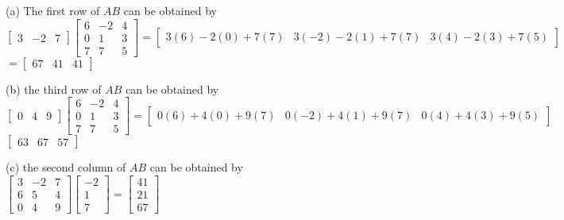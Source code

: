 \documentclass[addpoints]{exam}
\begin{document}
\begin{sloppypar}
\begin{questions}
\begin{solution}
        (a) The first row of $AB$ can be obtained by \\ 
        $ \begin{bmatrix}
            3 & -2 & 7
        \end{bmatrix} \begin{bmatrix}
            6 & -2 & 4 \\ 
            0 & 1 & 3 \\ 
            7 & 7 & 5
        \end{bmatrix} = \begin{bmatrix}
            3(6)-2(0)+7(7) & 3(-2)-2(1)+7(7) & 3(4)-2(3)+7(5) 
        \end{bmatrix}$ \\ 
        $ = \begin{bmatrix}
            67 & 41 & 41
        \end{bmatrix} $

        (b) the third row of $AB$ can be obtained by \\ 
        $ \begin{bmatrix}
            0 & 4 & 9
        \end{bmatrix} \begin{bmatrix}
            6 & -2 & 4 \\ 
            0 & 1 & 3 \\ 
            7 & 7 & 5
        \end{bmatrix} = \begin{bmatrix}
            0(6)+4(0)+9(7) & 0(-2)+4(1)+9(7) & 0(4)+4(3)+9(5)
        \end{bmatrix}$ \\ 
        $ \begin{bmatrix}
            63 & 67 & 57
        \end{bmatrix} $

        (c) the second column of $AB$ can be obtained by \\ 
        $ \begin{bmatrix}
            3 & -2 & 7 \\ 
            6 & 5 & 4 \\ 
            0 & 4 & 9
        \end{bmatrix} \begin{bmatrix}
            -2 \\ 1 \\ 7
        \end{bmatrix} = \begin{bmatrix}
            41 \\ 21 \\ 67
        \end{bmatrix} $


\end{solution}
\end{questions}
\end{sloppypar}
\end{document}
